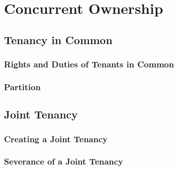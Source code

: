 \chapter{Concurrent Ownership}




%


\section{Tenancy in Common}




\subsection{Rights and Duties of Tenants in Common}






\begin{questions}

\end{questions}



\subsection{Partition}




\begin{questions}

\end{questions}



\section{Joint Tenancy}




\subsection{Creating a Joint Tenancy}




\subsection{Severance of a Joint Tenancy}






\begin{questions}

\end{questions}


